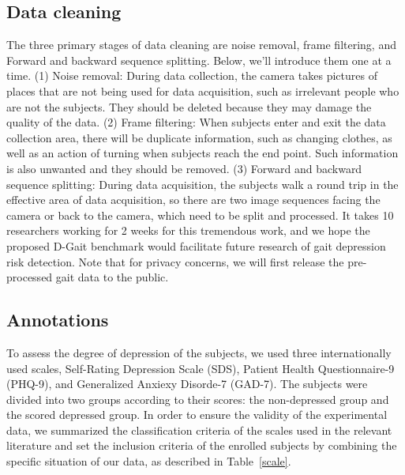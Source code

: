 \documentclass[10pt,twocolumn,letterpaper]{article}
\begin{document}
\subsection{Data cleaning}

The three primary stages of data cleaning are noise removal, frame filtering, and Forward and backward sequence splitting. Below, we'll introduce them one at a time.
(1) Noise removal: During data collection, the camera takes pictures of places that are not being used for data acquisition, such as irrelevant people who are not the subjects.
They should be deleted because they may damage the quality of the data.
(2) Frame filtering: When subjects enter and exit the data collection area, there will be duplicate information, such as changing clothes, as well as an action of turning when subjects reach the end point. Such information is also unwanted and they should be removed.
(3) Forward and backward sequence splitting: During data acquisition, the subjects walk a round trip in the effective area of data acquisition, so there are two image sequences facing the camera or back to the camera, which need to be split and processed.
It takes 10 researchers working for 2 weeks for this tremendous work, and we hope the proposed D-Gait benchmark would facilitate future research of gait depression risk detection.
Note that for privacy concerns, we will first release the pre-processed gait data to the public.


\subsection{Annotations}

To assess the degree of depression of the subjects, we used three internationally used scales, Self-Rating Depression Scale (SDS), Patient Health Questionnaire-9 (PHQ-9), and Generalized Anxiexy Disorde-7 (GAD-7). The subjects were divided into two groups according to their scores: the non-depressed group and the scored depressed group. In order to ensure the validity of the experimental data, we summarized the classification criteria of the scales used in the relevant literature and set the inclusion criteria of the enrolled subjects by combining the specific situation of our data, as described in Table~\ref{scale}.
\end{document}
